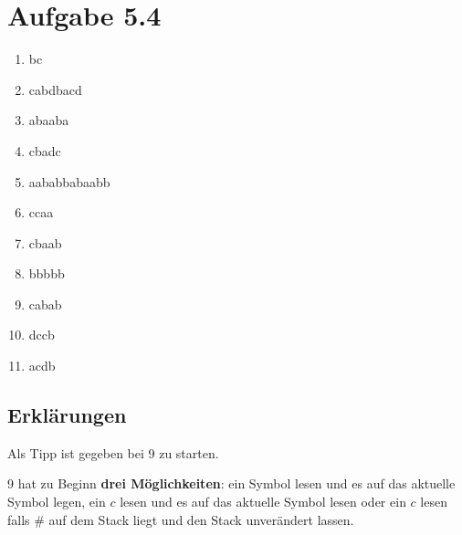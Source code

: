\documentclass{article}
\begin{document}
\begin{center}
\end{center}

\section*{Aufgabe 5.4}
\begin{enumerate}
	\item bc
	\item cabdbacd
	\item abaaba
	\item cbadc
	\item aababbabaabb
	\item ccaa
	\item cbaab
	\item bbbbb
  \item cabab
	\item dccb
  \item acdb
\end{enumerate}

\subsection*{Erklärungen}
Als Tipp ist gegeben bei 9 zu starten.

\bigskip

9 hat zu Beginn \textbf{drei Möglichkeiten}: ein Symbol lesen und es auf das aktuelle Symbol legen, ein $c$ lesen und es auf das aktuelle Symbol lesen oder ein $c$ lesen falls \# auf dem Stack liegt und den Stack unverändert lassen.
\end{document}
